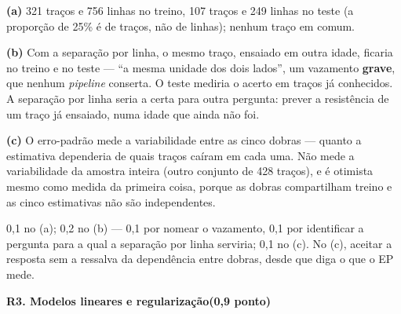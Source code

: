 \documentclass[11pt,a4paper]{article}
\newcommand{\tarefa}[3]{%
  \bigskip\par\noindent
  {\large\bfseries\color{azulufrj}#1. #2}\hfill{\bfseries(#3)}\par
  \nopagebreak\vspace{0.3em}}
\begin{document}
\begin{solucao}
\textbf{(a)} 321 traços e 756 linhas no treino, 107 traços e 249 linhas no teste (a
proporção de 25\% é de traços, não de linhas); nenhum traço em comum.

\textbf{(b)} Com a separação por linha, o mesmo traço, ensaiado em outra idade, ficaria
no treino e no teste --- ``a mesma unidade dos dois lados'', um vazamento
\textbf{grave}, que nenhum \emph{pipeline} conserta. O teste
mediria o acerto em traços já conhecidos. A separação por linha seria a certa para
outra pergunta: prever a resistência de um traço já ensaiado, numa idade que ainda não
foi.

\textbf{(c)} O erro-padrão mede a variabilidade entre as cinco dobras --- quanto a
estimativa dependeria de quais traços caíram em cada uma. Não mede a variabilidade da
amostra inteira (outro conjunto de 428 traços), e é otimista mesmo como medida da
primeira coisa, porque as dobras compartilham treino e as cinco estimativas não são
independentes.
\end{solucao}

\begin{criterio}
0,1 no (a); 0,2 no (b) --- 0,1 por nomear o vazamento, 0,1 por identificar a
pergunta para a qual a separação por linha serviria; 0,1 no (c). No (c), aceitar a
resposta sem a ressalva da dependência entre dobras, desde que diga o que o EP mede.
\end{criterio}

\tarefa{R3}{Modelos lineares e regularização}{0,9 ponto}
\end{document}
